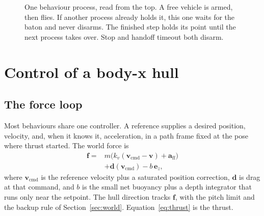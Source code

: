 \documentclass[conference]{IEEEtran}
\begin{document}
\begin{figure}[t]
\centering
{}
\caption{One behaviour process, read from the top. A free vehicle is armed, then flies. If another process already holds it, this one waits for the baton and never disarms. The finished step holds its point until the next process takes over. Stop and handoff timeout both disarm.}
\label{fig:auv}
\end{figure}

\section{Control of a body-x hull}
\label{sec:control}

\subsection{The force loop}
Most behaviours share one controller. A reference supplies a desired position, velocity, and, when it knows it, acceleration, in a path frame fixed at the pose where thrust started. The world force is
\begin{equation}
\begin{aligned}
\mathbf{f} = {} & m\big(k_{v}(\mathbf{v}_{\mathrm{cmd}}-\mathbf{v}) + \mathbf{a}_{\mathrm{ff}}\big) \\
& + \mathbf{d}(\mathbf{v}_{\mathrm{cmd}}) - b\,\mathbf{e}_{z},
\end{aligned}
\label{eq:force}
\end{equation}
where $\mathbf{v}_{\mathrm{cmd}}$ is the reference velocity plus a saturated position correction, $\mathbf{d}$ is drag at that command, and $b$ is the small net buoyancy plus a depth integrator that runs only near the setpoint. The hull direction tracks $\mathbf{f}$, with the pitch limit and the backup rule of Section~\ref{sec:world}. Equation~\eqref{eq:thrust} is the thrust.
\end{document}
